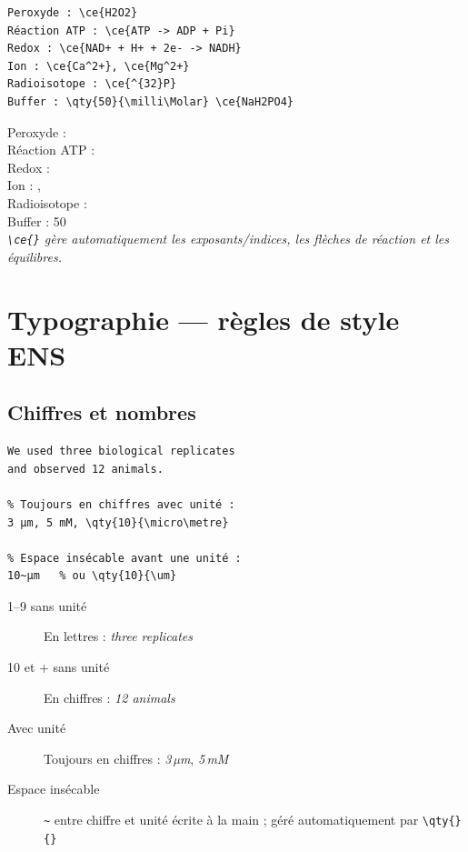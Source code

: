 \documentclass[12pt, a4paper]{article}
\begin{document}
\begin{demo}
\begin{lstlisting}[style=latexcode]
Peroxyde : \ce{H2O2}
Réaction ATP : \ce{ATP -> ADP + Pi}
Redox : \ce{NAD+ + H+ + 2e- -> NADH}
Ion : \ce{Ca^2+}, \ce{Mg^2+}
Radioisotope : \ce{^{32}P}
Buffer : \qty{50}{\milli\Molar} \ce{NaH2PO4}
\end{lstlisting}
\tcblower
Peroxyde : \\
Réaction ATP : \\
Redox : \\
Ion : , \\
Radioisotope : \\
Buffer : \qty{50}{\milli\Molar} \\[6pt]
{\footnotesize\itshape \texttt{\textbackslash ce\{\}} gère automatiquement les exposants/indices, les flèches de réaction et les équilibres.}
\end{demo}

\section{Typographie — règles de style ENS}

\subsection{Chiffres et nombres}

\begin{demo}
\begin{lstlisting}[style=latexcode]
% 1-9 sans unité : en lettres
We used three biological replicates
and observed 12 animals.

% Toujours en chiffres avec unité :
3 µm, 5 mM, \qty{10}{\micro\metre}

% Espace insécable avant une unité :
10~µm   % ou \qty{10}{\um}
\end{lstlisting}
\tcblower
\footnotesize
\begin{description}
  \item[1–9 sans unité] En lettres : \textit{three replicates}
  \item[10 et + sans unité] En chiffres : \textit{12 animals}
  \item[Avec unité] Toujours en chiffres : \textit{3\,µm}, \textit{5\,mM}
  \item[Espace insécable] \texttt{\textasciitilde} entre chiffre et unité écrite à la main ; géré automatiquement par \texttt{\textbackslash qty\{\}\{\}}
\end{description}
\end{demo}
\end{document}
